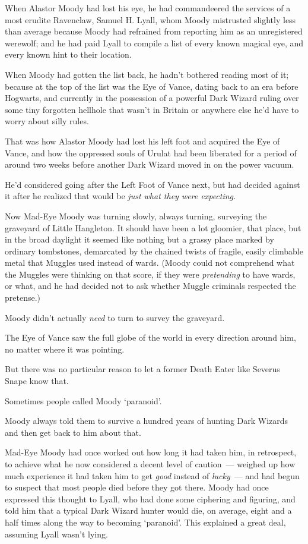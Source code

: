 When Alastor Moody had lost his eye, he had commandeered the services of a most erudite Ravenclaw, Samuel H. Lyall, whom Moody mistrusted slightly less than average because Moody had refrained from reporting him as an unregistered werewolf; and he had paid Lyall to compile a list of every known magical eye, and every known hint to their location.

When Moody had gotten the list back, he hadn't bothered reading most of it; because at the top of the list was the Eye of Vance, dating back to an era before Hogwarts, and currently in the possession of a powerful Dark Wizard ruling over some tiny forgotten hellhole that wasn't in Britain or anywhere else he'd have to worry about silly rules.

That was how Alastor Moody had lost his left foot and acquired the Eye of Vance, and how the oppressed souls of Urulat had been liberated for a period of around two weeks before another Dark Wizard moved in on the power vacuum.

He'd considered going after the Left Foot of Vance next, but had decided against it after he realized that would be \emph{just what they were expecting.}

Now Mad-Eye Moody was turning slowly, always turning, surveying the graveyard of Little Hangleton. It should have been a lot gloomier, that place, but in the broad daylight it seemed like nothing but a grassy place marked by ordinary tombstones, demarcated by the chained twists of fragile, easily climbable metal that Muggles used instead of wards. (Moody could not comprehend what the Muggles were thinking on that score, if they were \emph{pretending} to have wards, or what, and he had decided not to ask whether Muggle criminals respected the pretense.)

Moody didn't actually \emph{need} to turn to survey the graveyard.

The Eye of Vance saw the full globe of the world in every direction around him, no matter where it was pointing.

But there was no particular reason to let a former Death Eater like Severus Snape know that.

Sometimes people called Moody `paranoid'.

Moody always told them to survive a hundred years of hunting Dark Wizards and then get back to him about that.

Mad-Eye Moody had once worked out how long it had taken him, in retrospect, to achieve what he now considered a decent level of caution~--- weighed up how much experience it had taken him to get \emph{good} instead of \emph{lucky}~--- and had begun to suspect that most people died before they got there. Moody had once expressed this thought to Lyall, who had done some ciphering and figuring, and told him that a typical Dark Wizard hunter would die, on average, eight and a half times along the way to becoming `paranoid'. This explained a great deal, assuming Lyall wasn't lying.

